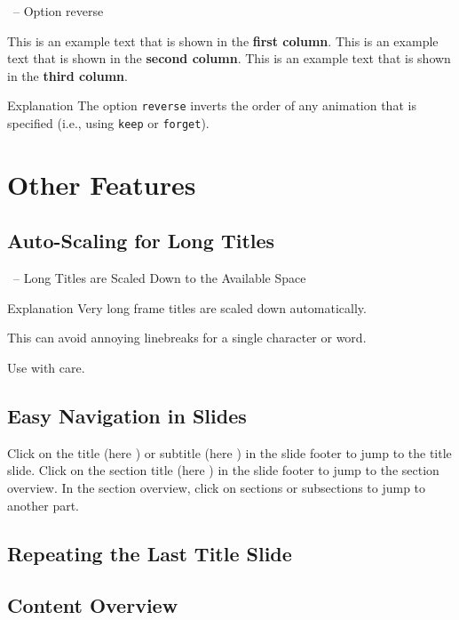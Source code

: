\documentclass[
	aspectratio=169, %
	8pt, %
]{beamer}
\begin{document}
\begin{frame}[label=current]{\insertsubsection\ -- Option reverse}
	\begin{fancycolumns}[columns=3,forget,reverse]
		This is an example text that is shown in the \textbf{first column}.
	\nextcolumn
		This is an example text that is shown in the \textbf{second column}.
	\nextcolumn
		This is an example text that is shown in the \textbf{third column}.
	\end{fancycolumns}
	\vfill
	\begin{note}{Explanation}
		The option \texttt{reverse} inverts the order of any animation that is specified (i.e., using \texttt{keep} or \texttt{forget}).
	\end{note}
\end{frame}

\section{Other Features}

\subsection{Auto-Scaling for Long Titles}
\begin{frame}{\insertsubsection\ -- Long Titles are Scaled Down to the Available Space}
	\begin{note}{Explanation}
		Very long frame titles are scaled down automatically.

		\hfill\hfill\hfill This can avoid annoying linebreaks for a single character or word.\hfill~

		\hfill Use with care.
	\end{note}
\end{frame}

\subsection{Easy Navigation in Slides}
\begin{frame}{\insertsubsection}
	\vfill
	Click on the title (here \textbf{\insertshorttitle}) or subtitle (here \textbf{\insertshortsubtitle}) in the slide footer to jump to the title slide.
	\vfill
	Click on the section title (here \textbf{\insertsection}) in the slide footer to jump to the section overview.
	\vfill
	In the section overview, click on sections or subsections to jump to another part.
	\vfill
\end{frame}

\subsection{Repeating the Last Title Slide}
\againtitle

\subsection{Content Overview}
\contentoverview[3] %
\end{document}
